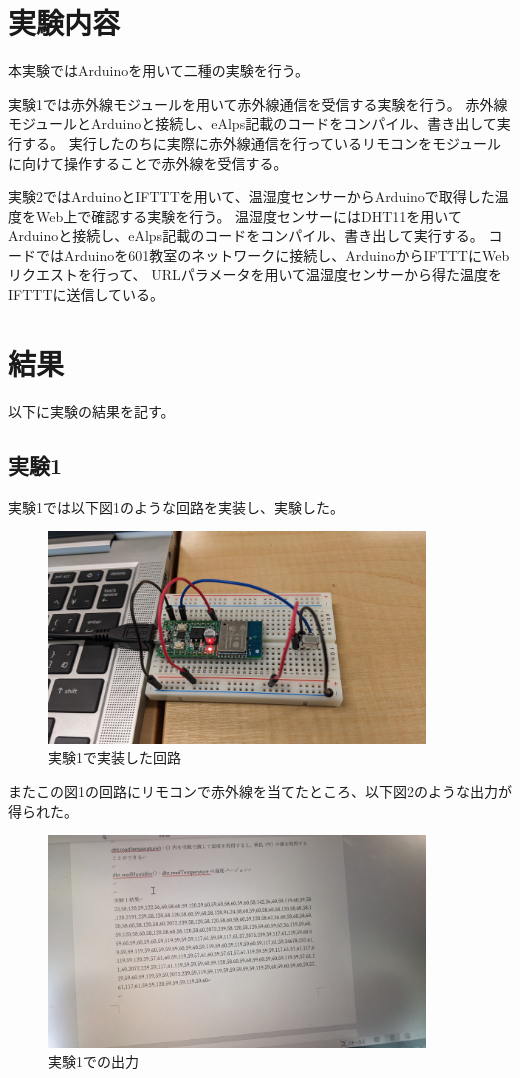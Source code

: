 \documentclass[a4paper,11pt,titlepage,dvipdfmx]{jsarticle}
\begin{document}
\section{実験内容}
本実験ではArduinoを用いて二種の実験を行う。

実験1では赤外線モジュールを用いて赤外線通信を受信する実験を行う。
赤外線モジュールとArduinoと接続し、eAlps記載のコードをコンパイル、書き出して実行する。
実行したのちに実際に赤外線通信を行っているリモコンをモジュールに向けて操作することで赤外線を受信する。

実験2ではArduinoとIFTTTを用いて、温湿度センサーからArduinoで取得した温度をWeb上で確認する実験を行う。
温湿度センサーにはDHT11を用いてArduinoと接続し、eAlps記載のコードをコンパイル、書き出して実行する。
コードではArduinoを601教室のネットワークに接続し、ArduinoからIFTTTにWebリクエストを行って、
URLパラメータを用いて温湿度センサーから得た温度をIFTTTに送信している。
\section{結果}
以下に実験の結果を記す。
\subsection{実験1}
実験1では以下図1のような回路を実装し、実験した。
\begin{figure}[h]
    \begin{center}
        \includegraphics[width=100mm]{./circuit.jpg}
    \end{center}
    \caption{実験1で実装した回路}
\end{figure}

またこの図1の回路にリモコンで赤外線を当てたところ、以下図2のような出力が得られた。
\begin{figure}[h]
    \begin{center}
        \includegraphics[width=100mm]{./infredrays.jpg}
    \end{center}
    \caption{実験1での出力}
\end{figure}
\newpage
\end{document}
